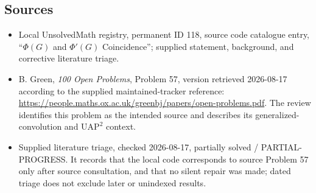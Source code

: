 \documentclass[11pt]{article}
\begin{document}
\subsection{Sources}
\begin{itemize}
\item Local UnsolvedMath registry, permanent ID 118, source code catalogue entry, ``$\Phi(G)$ and $\Phi'(G)$ Coincidence''; supplied statement, background, and corrective literature triage.
\item B. Green, \emph{100 Open Problems}, Problem 57, version retrieved 2026-08-17 according to the supplied maintained-tracker reference: \url{https://people.maths.ox.ac.uk/greenbj/papers/open-problems.pdf}. The review identifies this problem as the intended source and describes its generalized-convolution and $\mathrm{UAP}^{2}$ context.
\item Supplied literature triage, checked 2026-08-17, partially solved / PARTIAL-PROGRESS. It records that the local code corresponds to source Problem 57 only after source consultation, and that no silent repair was made; dated triage does not exclude later or unindexed results.
\end{itemize}
\end{document}
